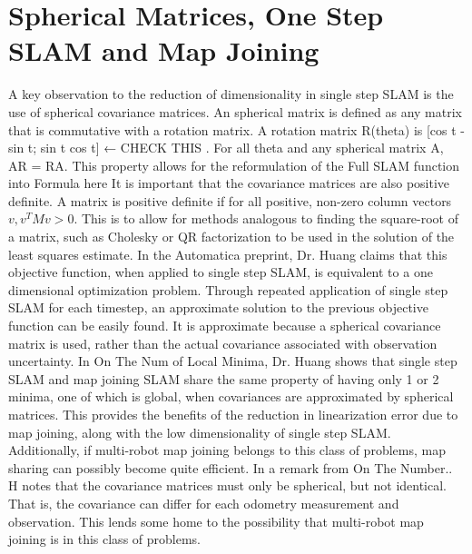 \documentclass[12pt]{report}
\begin{document}
\section{ Spherical Matrices, One Step SLAM and Map Joining}
A key observation to the reduction of dimensionality in single step SLAM is the 	use of spherical covariance matrices.  An spherical matrix is defined as any matrix that is commutative with a rotation matrix.  A rotation matrix R(theta) is [cos t -sin t; sin t cos t] ← CHECK THIS  .  For all theta and any spherical matrix A, AR = RA.  
This property allows for the reformulation of the Full SLAM function into 
Formula here
It is important that the covariance matrices are also positive definite.  A matrix is positive definite if for all positive, non-zero column vectors $v, v^T Mv > 0$. This is to allow for methods analogous to finding the square-root of a matrix, such as Cholesky or QR factorization to be used in the solution of the least squares estimate. 
In the Automatica preprint, Dr. Huang claims that this objective function, when applied to single step SLAM, is equivalent to a one dimensional optimization problem.  Through repeated application of single step SLAM for each timestep, an approximate solution to the previous objective function can be easily found.  It is approximate because a spherical covariance matrix is used, rather than the actual covariance associated with observation uncertainty.
In On The Num of Local Minima, Dr. Huang shows that single step SLAM and map joining SLAM share the same property of having only 1 or 2 minima, one of which is global, when covariances are approximated by spherical matrices.  This provides the benefits of the reduction in linearization error due to map joining, along with the low dimensionality of single step SLAM.  Additionally, if multi-robot map joining belongs to this class of problems, map sharing can possibly become quite efficient.
In a remark from On The Number.. H notes that the covariance matrices must only be spherical, but not identical.  That is, the covariance can differ for each odometry measurement and observation.  This lends some home to the possibility that multi-robot map joining is in this class of problems.
\end{document}
